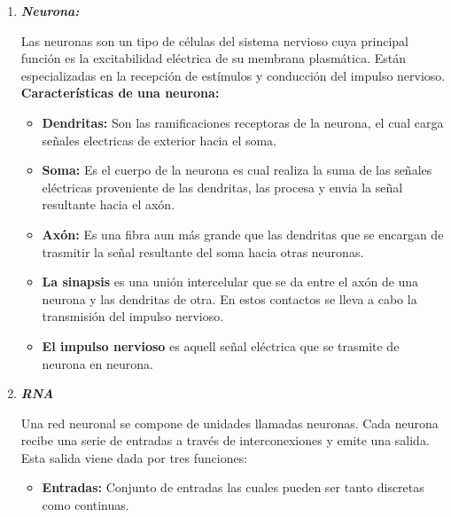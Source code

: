 \documentclass[journal]{IEEEtran}
\begin{document}
\begin{enumerate}
\item \textbf{\emph{Neurona:}}
        
Las neuronas son un tipo de células del sistema nervioso cuya principal función es la excitabilidad eléctrica de su membrana plasmática. Están especializadas en la recepción de estímulos y conducción del impulso nervioso.\\
        
\textbf{Características de una neurona:}
\begin{itemize}
\item \textbf{Dendritas:} Son las ramificaciones receptoras de la neurona, el cual carga señales electricas de exterior hacia el soma.\\
        		
\item \textbf{Soma:} Es el cuerpo de la neurona es cual realiza la suma de las señales eléctricas proveniente de las dendritas, las procesa y envia la señal resultante hacia el axón.\\
        		
\item \textbf{Axón:} Es una fibra aun más grande que las dendritas que se encargan de trasmitir la señal resultante del soma hacia otras neuronas.\\
        		
\item \textbf{La sinapsis} es una unión intercelular que se da entre el axón de una neurona y las dendritas de otra. En estos contactos se lleva a cabo la transmisión del impulso nervioso.\\
        		
\item \textbf{El impulso nervioso} es aquell señal eléctrica que se trasmite de neurona en neurona.\\
\end{itemize}
    
\item \textbf{\emph{RNA}}
    
Una red neuronal se compone de unidades llamadas neuronas. Cada neurona recibe una serie de entradas a través de interconexiones y emite una salida. Esta salida viene dada por tres funciones:
    
\begin{itemize}
\item \textbf{Entradas:} Conjunto de entradas las cuales pueden ser tanto discretas como continuas.\\
    		

\end{itemize}
\end{enumerate}
\end{document}
